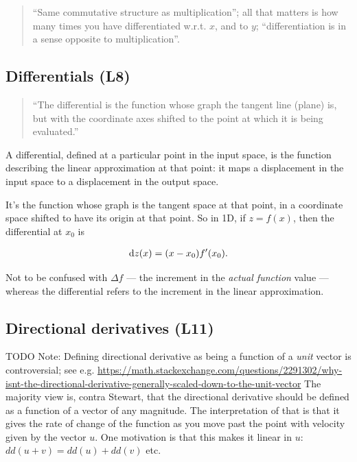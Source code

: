 \begin{quote}
  ``Same commutative structure as multiplication''; all that matters
  is how many times you have differentiated w.r.t. $x$, and to $y$;
  ``differentiation is in a sense opposite to multiplication''.
\end{quote}

\subsection{Differentials (L8)}

\begin{quote}
  ``The differential is the function whose graph the tangent line (plane) is,
  but with the coordinate axes shifted to the point at which it is being
  evaluated.''
\end{quote}

A differential, defined at a particular point in the input space, is the
function describing the linear approximation at that point: it maps a
displacement in the input space to a displacement in the output space.

It's the function whose graph is the tangent space at that point, in a
coordinate space shifted to have its origin at that point. So in 1D, if
$z = f(x)$, then the differential at $x_0$ is

\begin{align*}
  \dz(x) = (x - x_0)f'(x_0).
\end{align*}


Not to be confused with $\Delta f$ --- the increment in the \textit{actual
  function} value --- whereas the differential refers to the increment in the
linear approximation.


\subsection{Directional derivatives (L11)}

TODO Note: Defining directional derivative as being a function of a \textit{unit} vector is
controversial; see
e.g. \url{https://math.stackexchange.com/questions/2291302/why-isnt-the-directional-derivative-generally-scaled-down-to-the-unit-vector}
The majority view is, contra Stewart, that the directional derivative should be defined as a
function of a vector of any magnitude. The interpretation of that is that it gives the rate of
change of the function as you move past the point with velocity given by the vector $u$. One
motivation is that this makes it linear in $u$: $dd(u + v) = dd(u) + dd(v)$ etc.


